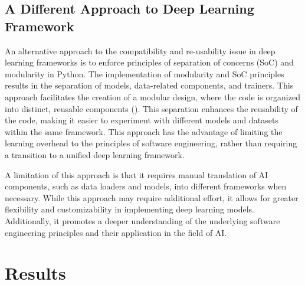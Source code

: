 \documentclass{IEEEtran}
\begin{document}


\subsection{A Different Approach to Deep Learning Framework}

An alternative approach to the compatibility and re-usability issue in deep learning frameworks is to enforce principles of separation of concerns (SoC) and modularity in Python. 
The implementation of modularity and SoC principles results in the separation of models, data-related components, and trainers. 
This approach facilitates the creation of a modular design, where the code is organized into distinct, reusable components (\cite{sanner1999python,pressman2010software}). This separation enhances the reusability of the code, making it easier to experiment with different models and datasets within the same framework. This approach has the advantage of limiting the learning overhead to the principles of software engineering, rather than requiring a transition to a unified deep learning framework.



A limitation of this approach is that it requires manual translation of AI components, such as data loaders and models, into different frameworks when necessary. While this approach may require additional effort, it allows for greater flexibility and customizability in implementing deep learning models. Additionally, it promotes a deeper understanding of the underlying software engineering principles and their application in the field of AI.



\section{Results}
\end{document}
